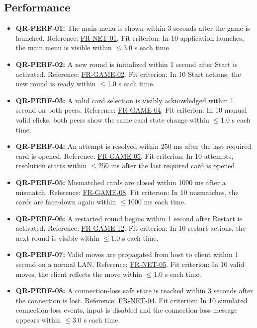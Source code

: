 \documentclass[a4paper,12pt]{article}
\newcommand{\reqref}[1]{\hyperlink{req:#1}{#1}}
\begin{document}
    \subsection{Performance}
    \begin{itemize}
        \item \textbf{QR-PERF-01:} The main menu is shown within 3 seconds after the game is launched. Reference: \reqref{FR-NET-01}. Fit criterion: In 10 application launches, the main menu is visible within $\le$3.0 s each time.
        \item \textbf{QR-PERF-02:} A new round is initialized within 1 second after Start is activated. Reference: \reqref{FR-GAME-02}. Fit criterion: In 10 Start actions, the new round is ready within $\le$1.0 s each time.
        \item \textbf{QR-PERF-03:} A valid card selection is visibly acknowledged within 1 second on both peers. Reference: \reqref{FR-GAME-04}. Fit criterion: In 10 manual valid clicks, both peers show the same card state change within $\le$1.0 s each time.
        \item \textbf{QR-PERF-04:} An attempt is resolved within 250 ms after the last required card is opened. Reference: \reqref{FR-GAME-05}. Fit criterion: In 10 attempts, resolution starts within $\le$250 ms after the last required card is opened.
        \item \textbf{QR-PERF-05:} Mismatched cards are closed within 1000 ms after a mismatch. Reference: \reqref{FR-GAME-08}. Fit criterion: In 10 mismatches, the cards are face-down again within $\le$1000 ms each time.
        \item \textbf{QR-PERF-06:} A restarted round begins within 1 second after Restart is activated. Reference: \reqref{FR-GAME-12}. Fit criterion: In 10 restart actions, the next round is visible within $\le$1.0 s each time.
        \item \textbf{QR-PERF-07:} Valid moves are propagated from host to client within 1 second on a normal LAN. Reference: \reqref{FR-NET-05}. Fit criterion: In 10 valid moves, the client reflects the move within $\le$1.0 s each time.
        \item \textbf{QR-PERF-08:} A connection-loss safe state is reached within 3 seconds after the connection is lost. Reference: \reqref{FR-NET-04}. Fit criterion: In 10 simulated connection-loss events, input is disabled and the connection-loss message appears within $\le$3.0 s each time.
    \end{itemize}
\end{document}
